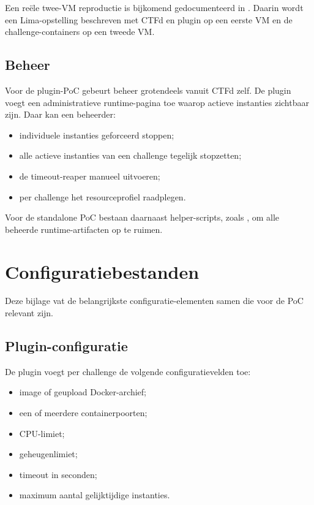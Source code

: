 \documentclass[dutch,dit,thesis]{hogentreport}
\begin{document}
Een reële twee-VM reproductie is bijkomend gedocumenteerd in . Daarin wordt een Lima-opstelling beschreven met CTFd en plugin op een eerste VM en de challenge-containers op een tweede VM.

\section*{Beheer}

Voor de plugin-PoC gebeurt beheer grotendeels vanuit CTFd zelf. De plugin voegt een administratieve runtime-pagina toe waarop actieve instanties zichtbaar zijn. Daar kan een beheerder:

\begin{itemize}
  \item individuele instanties geforceerd stoppen;
  \item alle actieve instanties van een challenge tegelijk stopzetten;
  \item de timeout-reaper manueel uitvoeren;
  \item per challenge het resourceprofiel raadplegen.
\end{itemize}

Voor de standalone PoC bestaan daarnaast helper-scripts, zoals , om alle beheerde runtime-artifacten op te ruimen.

\chapter{Configuratiebestanden}
\label{app:configuratie}

Deze bijlage vat de belangrijkste configuratie-elementen samen die voor de PoC relevant zijn.

\section*{Plugin-configuratie}

De plugin voegt per challenge de volgende configuratievelden toe:

\begin{itemize}
  \item image of geupload Docker-archief;
  \item een of meerdere containerpoorten;
  \item CPU-limiet;
  \item geheugenlimiet;
  \item timeout in seconden;
  \item maximum aantal gelijktijdige instanties.
\end{itemize}
\end{document}
